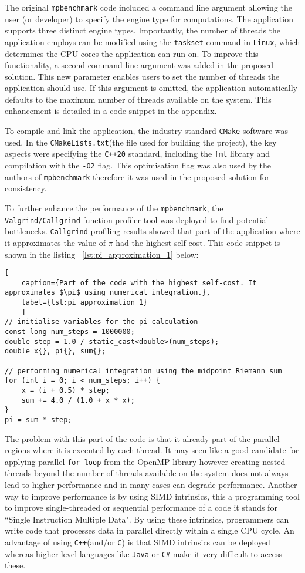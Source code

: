 The original \texttt{mpbenchmark} code included a command line argument allowing the user (or developer) to specify the engine type for computations. The application supports three distinct engine types. Importantly, the number of threads the application employs can be modified using the \texttt{taskset} command in \texttt{Linux}, which determines the CPU cores the application can run on. To improve this functionality, a second command line argument was added in the proposed solution. This new parameter enables users to set the number of threads the application should use. If this argument is omitted, the application automatically defaults to the maximum number of threads available on the system. This enhancement is detailed in a code snippet in the appendix.

To compile and link the application, the industry standard \texttt{CMake}\cite{cmake_about} software was used. In the \texttt{CMakeLists.txt}(the file used for building the project), the key aspects were specifying the \texttt{C++20} standard, including the \texttt{fmt} library and compilation with the \texttt{-O2} flag. This optimisation flag was also used by the authors of \texttt{mpbenchmark}\cite{mpbenchmark_paper} therefore it was used in the proposed solution for consistency. 

To further enhance the performance of the \texttt{mpbenchmark}, the \texttt{Valgrind/Callgrind} function profiler tool was deployed to find potential bottlenecks. \texttt{Callgrind} profiling results showed that part of the application where it approximates the value of $\pi$ had the highest self-cost. This code snippet is shown in the listing ~\ref{lst:pi_approximation_1} below:

\begin{lstlisting}[
	caption={Part of the code with the highest self-cost. It approximates $\pi$ using numerical integration.},
	label={lst:pi_approximation_1}
	]
// initialise variables for the pi calculation
const long num_steps = 1000000;
double step = 1.0 / static_cast<double>(num_steps);
double x{}, pi{}, sum{};

// performing numerical integration using the midpoint Riemann sum
for (int i = 0; i < num_steps; i++) {
	x = (i + 0.5) * step;
	sum += 4.0 / (1.0 + x * x);
}
pi = sum * step;
\end{lstlisting}

The problem with this part of the code is that it already part of the parallel regions where it is executed by each thread. It may seen like a good candidate for applying parallel \texttt{for loop} from the OpenMP library however creating nested threads beyond the number of threads available on the system does not always lead to higher performance and in many cases can degrade performance. Another way to improve performance is by using SIMD intrinsics, this a programming tool to improve single-threaded or sequential performance of a code it stands for ``Single Instruction Multiple Data". By using these intrinsics, programmers can write code that processes data in parallel directly within a single CPU cycle. An advantage of using \texttt{C++}(and/or \texttt{C}) is that SIMD intrinsics can be deployed whereas higher level languages like \texttt{Java} or \texttt{C\#} make it very difficult to access these. 

